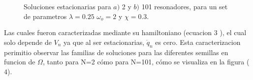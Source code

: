 \documentclass[11pt,letterpaper,twocolumn]{article}
\begin{document}
\begin{figure}[h!]
\centering
{}
\caption{Soluciones estacionarias para $a)$ 2 y $b)$ 101 resonadores, para un set de parametros $\lambda=0.25$ $\omega_{o}=2$ y $\chi=0.3$.}
\end{figure}
\par 
Las cuales fueron caracterizadas mediante su hamiltoniano (ecuacion $3$ ), el cual solo depende de $V_{n}$ ya que al ser estacionarias, $\dot{q}_{n}$ es cero. Esta caracterizacion perimitio observar las familias de soluciones para las diferentes semillas en funcion de $\Omega$, tanto para N=2 cómo para N=101, cómo se visualiza en la figura ($4$).
\end{document}
